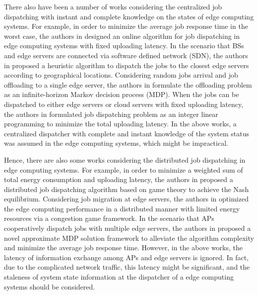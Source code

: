 There also have been a number of works considering the centralized job dispatching with instant and complete knowledge on the states of edge computing systems.
For example, in order to minimize the average job response time in the worst case, the authors in \cite{tan-online} designed an online algorithm for job dispatching in edge computing systems with fixed uploading latency.
In the scenario that BSs and edge servers are connected via software defined network (SDN), the authors in \cite{IOTJ18-FanQ} proposed a heuristic algorithm to dispatch the jobs to the closest edge servers according to geographical locations.
Considering random jobs arrival and job offloading to a single edge server, the authors in \cite{mdp-globecom,mdp-tvt} formulate the offloading problem as an infinite-horizon Markov decision process (MDP).
When the jobs can be dispatched to either edge servers or cloud servers with fixed uploading latency, the authors in \cite{MASS18-MengZ} formulated job dispatching problem as an integer linear programming to minimize the total uploading latency.
In the above works, a centralized dispatcher with complete and instant knowledge of the system status was assumed in the edge computing systems, which might be impractical.

{
    Hence, there are also some works considering the distributed job dispatching in edge computing systems.
    For example, in order to minimize a weighted sum of total energy consumption and uploading latency, the authors in \cite{ToN-Xuchen2016} proposed a distributed job dispatching algorithm based on game theory to achieve the Nash equilibrium. 
    Considering job migration at edge servers, the authors in \cite{ToN-xujie2018} optimized the edge computing performance in a distributed manner with limited energy resources via a congestion game framework.
    In the scenario that APs cooperatively dispatch jobs with multiple edge servers, the authors in \cite{mdp-jcin} proposed a novel approximate MDP solution framework to alleviate the algorithm complexity and minimize the average job response time.
    However, in the above works, the latency of information exchange among APs and edge servers is ignored.
    In fact, due to the complicated network traffic, this latency might be significant, and the staleness of system state information at the dispatcher of a edge computing systems should be considered.
}

